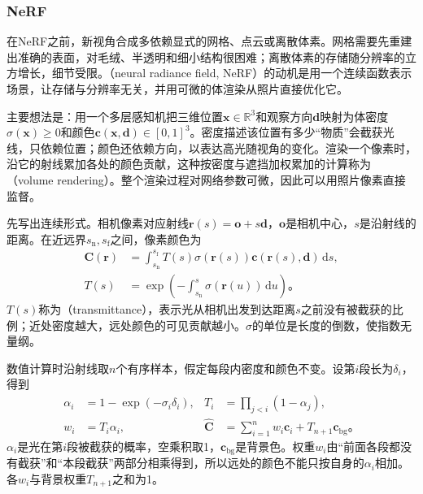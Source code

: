 \subsubsection{NeRF}
\label{sec:vision-generation-nerf}

在NeRF之前，新视角合成多依赖显式的网格、点云或离散体素。网格需要先重建出准确的表面，对毛绒、半透明和细小结构很困难；离散体素的存储随分辨率的立方增长，细节受限。（neural radiance field, NeRF）的动机是用一个连续函数表示场景，让存储与分辨率无关，并用可微的体渲染从照片直接优化它。

主要想法是：用一个多层感知机把三维位置$\bm{x}\in\mathbb{R}^3$和观察方向$\bm{d}$映射为体密度$\sigma(\bm{x})\geq0$和颜色$\bm{c}(\bm{x},\bm{d})\in[0,1]^3$。密度描述该位置有多少“物质”会截获光线，只依赖位置；颜色还依赖方向，以表达高光随视角的变化。渲染一个像素时，沿它的射线累加各处的颜色贡献，这种按密度与遮挡加权累加的计算称为（volume rendering）。整个渲染过程对网络参数可微，因此可以用照片像素直接监督。

先写出连续形式。相机像素对应射线$\bm{r}(s)=\bm{o}+s\bm{d}$，$\bm{o}$是相机中心，$s$是沿射线的距离。在近远界$s_{\mathrm{n}},s_{\mathrm{f}}$之间，像素颜色为
\begin{equation}
 \begin{aligned}
 \bm{C}(\bm{r})
 &=\int_{s_{\mathrm{n}}}^{s_{\mathrm{f}}}
    T(s)\sigma(\bm{r}(s))
    \bm{c}(\bm{r}(s),\bm{d})\,\mathrm{d}s,\\
 T(s)&=\exp\!\left(
     -\int_{s_{\mathrm{n}}}^{s}\sigma(\bm{r}(u))\,\mathrm{d}u
    \right)\text{。}
 \end{aligned}
 \label{eq:vision-nerf-continuous}
\end{equation}
$T(s)$称为（transmittance），表示光从相机出发到达距离$s$之前没有被截获的比例；近处密度越大，远处颜色的可见贡献越小。$\sigma$的单位是长度的倒数，使指数无量纲。

数值计算时沿射线取$n$个有序样本，假定每段内密度和颜色不变。设第$i$段长为$\delta_i$，得到
\begin{equation}
 \begin{aligned}
 \alpha_i&=1-\exp(-\sigma_i\delta_i),&
 T_i&=\prod_{j<i}(1-\alpha_j),\\
 w_i&=T_i\alpha_i,&
 \widehat{\bm{C}}&=\sum_{i=1}^{n}w_i\bm{c}_i
       +T_{n+1}\bm{c}_{\mathrm{bg}}\text{。}
 \end{aligned}
 \label{eq:vision-nerf-discrete}
\end{equation}
$\alpha_i$是光在第$i$段被截获的概率，空乘积取1，$\bm{c}_{\mathrm{bg}}$是背景色。权重$w_i$由“前面各段都没有截获”和“本段截获”两部分相乘得到，所以远处的颜色不能只按自身的$\alpha_i$相加。各$w_i$与背景权重$T_{n+1}$之和为1。

